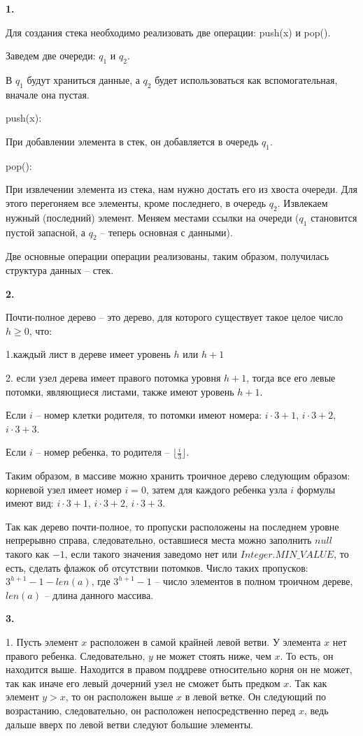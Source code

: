 \documentclass[12pt]{extreport}
\begin{document}
{\bf 1.} 

Для создания стека необходимо реализовать две операции: push(x) и pop().

Заведем две очереди: $q_1$ и $q_2$.

В $q_1$ будут храниться данные, а $q_2$ будет использоваться как вспомогательная, вначале она пустая.

push(x):

При добавлении элемента в стек, он добавляется в очередь $q_1$.

pop():

При извлечении элемента из стека, нам нужно достать его из хвоста очереди. Для этого перегоняем все элементы, кроме последнего, в очередь $q_2$. Извлекаем нужный (последний) элемент. Меняем местами ссылки на очереди ($q_1$ становится пустой запасной, а $q_2$ -- теперь основная с данными).

Две основные операции операции реализованы, таким образом, получилась структура данных -- стек. 

\bigskip

{\bf 2.} 

Почти-полное дерево -- это дерево, для которого существует такое целое число $h \geq 0$, что: 

1.каждый лист в дереве имеет уровень $h$ или $h + 1$

2. если узел дерева имеет правого потомка уровня $h + 1$, тогда все его левые потомки, являющиеся листами, также имеют уровень $h + 1$.

Если $i$ -- номер клетки родителя, то потомки имеют номера: $i \cdot 3 +1$, $i \cdot 3 +2$, $i \cdot 3 +3$.

Если $i$ -- номер ребенка, то родителя -- $\lfloor \frac{i}{3} \rfloor$.

Таким образом, в массиве можно хранить троичное дерево следующим образом: корневой узел имеет номер $i = 0$, затем для каждого ребенка узла $i$ формулы имеют вид: $i \cdot 3 +1$, $i \cdot 3 +2$, $i \cdot 3 +3$. 

Так как дерево почти-полное, то пропуски расположены на последнем уровне непрерывно справа, следовательно, оставшиеся места можно заполнить $null$ такого как $-1$, если такого значения заведомо нет или $Integer.MIN\_VALUE$, то есть, сделать флажок об отсутствии потомков. Число таких пропусков: $3^{h+1} -1 - len(a)$, где $3^{h+1} -1$ -- число элементов в полном троичном дереве, $len(a)$ -- длина данного массива. 
\bigskip

{\bf 3.} 

1. Пусть элемент $x$ расположен в самой крайней левой ветви. У элемента $x$ нет правого ребенка. Следовательно, $y$ не может стоять ниже, чем $x$. То есть, он находится выше. Находится в правом поддреве относительно корня он не может, так как иначе его левый дочерний узел не сможет быть предком $x$. Так как элемент $y > x$, то он расположен выше $x$ в левой ветке. Он следующий по возрастанию, следовательно, он расположен непосредственно перед $x$, ведь дальше вверх по левой ветви следуют большие элементы. 
\end{document}
